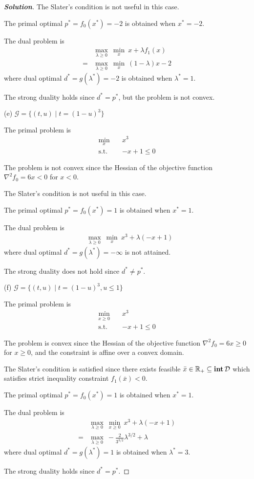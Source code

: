 \documentclass[11pt]{article}
\newenvironment{solution}
  {\renewcommand\qedsymbol{$\square$}\begin{proof}[\textbf{Solution}]}
  {\end{proof}}
\newcommand{\hess}{\nabla^2}
\begin{document}
\begin{solution}
The Slater's condition is not useful in this case.

The primal optimal $p^* = f_0(x^*) = -2$ is obtained when $x^* = -2$.

The dual problem is
\begin{align*}
  &\max_{\lambda\geq 0}\ \min_x \ x + \lambda f_1(x)\\
  =& \max_{\lambda\geq 0}\ \min_x \ (1 - \lambda) x - 2
\end{align*}
where dual optimal $d^* = g(\lambda^*) = -2$ is obtained when $\lambda^* = 1$.

The strong duality holds since $d^* = p^*$, but the problem is not convex.

(e) $\mathcal{G} = \{(t, u) \mid t = (1-u)^3\}$

The primal problem is
\begin{align*}
  \min_x \quad & x^3\\
  \text{s.t.} \quad & -x + 1 \leq 0
\end{align*}

The problem is not convex since the Hessian of the objective function $\hess f_0 = 6x<0$ for $x<0$.

The Slater's condition is not useful in this case.

The primal optimal $p^* = f_0(x^*) = 1$ is obtained when $x^* = 1$.

The dual problem is
\begin{align*}
  &\max_{\lambda\geq 0}\ \min_x \ x^3 + \lambda (-x + 1)
\end{align*}
where dual optimal $d^* = g(\lambda^*) = -\infty$ is not attained.

The strong duality does not hold since $d^* \neq p^*$.

(f) $\mathcal{G} = \{(t, u) \mid t = (1-u)^3, u \leq 1\}$

The primal problem is
\begin{align*}
  \min_{x\geq 0} \quad & x^3\\
  \text{s.t.} \quad & -x + 1 \leq 0
\end{align*}

The problem is convex since the Hessian of the objective function $\hess f_0 = 6x\geq 0$ for $x\geq 0$, and the constraint is affine over a convex domain.

The Slater's condition is satisfied since there exists feasible $\bar x\in{{\mathbb{R}}}_+ \subseteq \mathop{\textbf{int}} \mathcal{D}$ which satisfies strict inequality constraint $f_1(\bar x) <0 $.

The primal optimal $p^* = f_0(x^*) = 1$ is obtained when $x^* = 1$.

The dual problem is
\begin{align*}
  &\max_{\lambda\geq 0}\ \min_{x\geq 0} \ x^3 + \lambda (-x + 1)\\
  =&\max_{\lambda\geq 0}\ -\frac{2}{3^{3/2}} \lambda^{3/2} + \lambda
\end{align*}
where dual optimal $d^* = g(\lambda^*) = 1$ is obtained when $\lambda^* = 3$.

The strong duality holds since $d^* = p^*$.
\end{solution}
\end{document}
